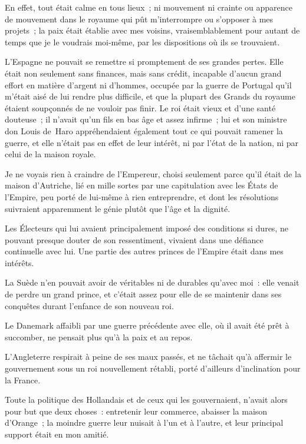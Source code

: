 \documentclass[french,twoside]{book} %
\begin{document}
En effet, tout était calme en tous lieux ; ni mouvement ni crainte ou apparence de mouvement dans le royaume qui pût m’interrompre ou s’opposer à mes projets ; la paix était établie avec mes voisins, vraisemblablement pour autant de temps que je le voudrais moi-même, par les dispositions où ils se trouvaient.\par
L’Espagne ne pouvait se remettre si promptement de ses grandes pertes. Elle était non seulement sans finances, mais sans crédit, incapable d’aucun grand effort en matière d’argent ni d’hommes, occupée par la guerre de Portugal qu’il m’était aisé de lui rendre plus difficile, et que la plupart des Grands du royaume étaient soupçonnés de ne vouloir pas finir. Le roi était vieux et d’une santé douteuse ; il n’avait qu’un fils en bas âge et assez infirme ; lui et son ministre don Louis de Haro appréhendaient également tout ce qui pouvait ramener la guerre, et elle n’était pas en effet de leur intérêt, ni par l’état de la nation, ni par celui de la maison royale.\par
Je ne voyais rien à craindre de l’Empereur, choisi seulement parce qu’il était de la maison d’Autriche, lié en mille sortes par une capitulation avec les États de l’Empire, peu porté de lui-même à rien entreprendre, et dont les résolutions suivraient apparemment le génie plutôt que l’âge et la dignité.\par
Les Électeurs qui lui avaient principalement imposé des conditions si dures, ne pouvant presque douter de son ressentiment, vivaient dans une défiance continuelle avec lui. Une partie des autres princes de l’Empire était dans mes intérêts.\par
La Suède n’en pouvait avoir de véritables ni de durables qu’avec moi : elle venait de perdre un grand prince, et c’était assez pour elle de se maintenir dans ses conquêtes durant l’enfance de son nouveau roi.\par
Le Danemark affaibli par une guerre précédente avec elle, où il avait été prêt à succomber, ne pensait plus qu’à la paix et au repos.\par
L’Angleterre respirait à peine de ses maux passés, et ne tâchait qu’à affermir le gouvernement sous un roi nouvellement rétabli, porté d’ailleurs d’inclination pour la France.\par
Toute la politique des Hollandais et de ceux qui les gouvernaient, n’avait alors pour but que deux choses : entretenir leur commerce, abaisser la maison d’Orange ; la moindre guerre leur nuisait à l’un et à l’autre, et leur principal support était en mon amitié.\par
\end{document}
